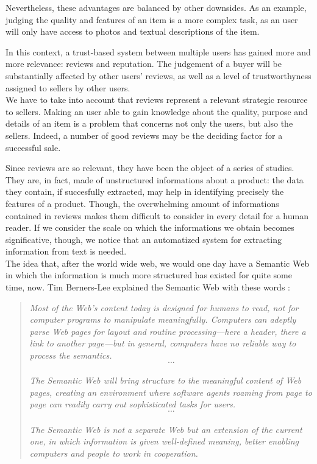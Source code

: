 \documentclass[LaM,oneside,binding=0.6cm]{sapthesis}
\begin{document}
 Nevertheless, these advantages are balanced by other downsides. As an example, judging the quality and features of an item is a more complex task, as an user will only have access to photos and textual descriptions of the item.

 In this context, a trust-based system between multiple users has gained more and more relevance: reviews and reputation. The judgement of a buyer will be substantially affected by other users' reviews, as well as a level of trustworthyness assigned to sellers by other users. \\

 We have to take into account that reviews represent a relevant strategic resource to sellers.
 Making an user able to gain knowledge about the quality, purpose and details of an item is a problem that concerns not only the users, but also the sellers. Indeed, a number of good reviews may be the deciding factor for a successful sale. 

 \bigskip

 Since reviews are so relevant, they have been the object of a series of studies. They are, in fact, made of unstructured informations about a product: the data they contain, if succesfully extracted, may help in identifying precisely the features of a product. Though, the overwhelming amount of informations contained in reviews makes them difficult to consider in every detail for a human reader. If we consider the scale on which the informations we obtain becomes significative, though, we notice that an automatized system for extracting information from text is needed. \\ 

 The idea that, after the world wide web, we would one day have a Semantic Web in which the information is much more structured has existed for quite some time, now. Tim Berners-Lee explained the Semantic Web with these words \parencite{berners-lee_semantic_2001}:

\bigskip

\begin{quote}
\textit{Most of the Web's content today is designed for humans to read, not for computer programs to manipulate
meaningfully. Computers can adeptly parse Web pages for layout and routine processing—here a header, there a link to another page—but in
general, computers have no reliable way to process the semantics. \\
\[...\] \\
The Semantic Web will bring structure to the meaningful content of Web pages, creating an environment where software agents roaming from
page to page can readily carry out sophisticated tasks for users. \\
\[...\] \\
The Semantic Web is not a separate Web but an extension of the current one, in which information is given well-defined meaning, better enabling computers and people to work in cooperation.}
\end{quote}
\end{document}
